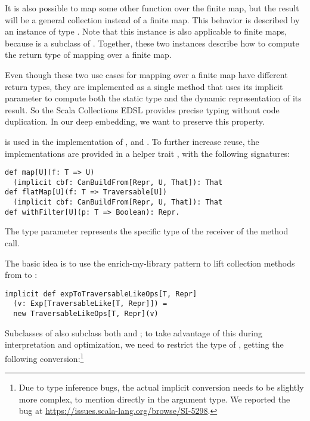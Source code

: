 It is also possible to map some other function over the finite map, but the result will be a general collection instead of a finite map. This behavior is described by an instance of type \code{CanBuildFrom[Traversable[T], U, Traversable[U]}. Note that this instance is also applicable to finite maps, because  is a subclass of . Together, these two instances describe how to compute the return type of mapping over a finite map.

Even though these two use cases for mapping over a finite map have different return types, they are implemented as a single method that uses its implicit  parameter to compute both the static type and the dynamic representation of its result. So the Scala Collections EDSL provides precise typing without code duplication. In our deep embedding, we want to preserve this property.

 is used in the implementation of ,  and . To further increase reuse, the implementations are provided in a helper trait , with the following signatures:

\begin{lstlisting}
def map[U](f: T => U)
  (implicit cbf: CanBuildFrom[Repr, U, That]): That
def flatMap[U](f: T => Traversable[U])
  (implicit cbf: CanBuildFrom[Repr, U, That]): That
def withFilter[U](p: T => Boolean): Repr.
\end{lstlisting}

The  type parameter represents the specific type of the receiver of the method call.

The basic idea is to use the enrich-my-library pattern to lift collection methods from  to :
\begin{lstlisting}
implicit def expToTraversableLikeOps[T, Repr]
  (v: Exp[TraversableLike[T, Repr]]) =
  new TraversableLikeOps[T, Repr](v)
\end{lstlisting}

Subclasses of  also subclass both  and ; to take advantage of this during interpretation and optimization, we need to restrict the type of , getting the following conversion:\footnote{Due to type inference bugs, the actual implicit conversion needs to be slightly more complex, to mention  directly in the argument type. We reported the bug at \url{https://issues.scala-lang.org/browse/SI-5298}.}

